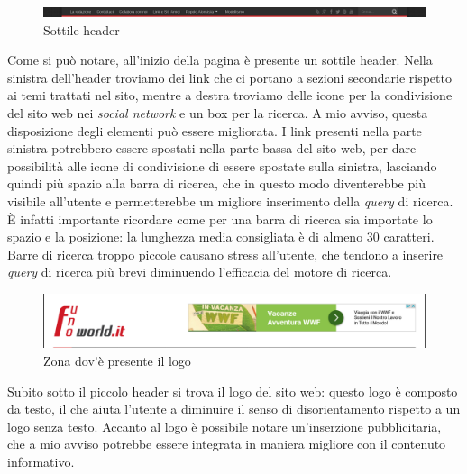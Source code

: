 \begin{figure}[H]
  \centering
  \includegraphics[scale=0.27]{top_header}
  \caption{Sottile header}
\end{figure}
Come si pu\`o notare, all'inizio della pagina \`e presente un sottile header.
Nella sinistra dell'header troviamo dei link che ci portano a sezioni secondarie
rispetto ai temi trattati nel sito, mentre a destra troviamo delle icone per la
condivisione del sito web nei \textit{social network} e un box per la ricerca.
A mio avviso, questa disposizione degli elementi pu\`o essere migliorata. I link
presenti nella parte sinistra potrebbero essere spostati nella parte bassa del
sito web, per dare possibilit\`a alle icone di condivisione di essere spostate
sulla sinistra, lasciando quindi pi\`u spazio alla barra di ricerca, che in
questo modo diventerebbe pi\`u visibile all'utente e permetterebbe un migliore
inserimento della \textit{query} di ricerca. \`E infatti importante ricordare
come per una barra di ricerca sia importate lo spazio e la posizione: la
lunghezza media consigliata \`e di almeno 30 caratteri. Barre di ricerca troppo
piccole causano stress all'utente, che tendono a inserire \textit{query} di
ricerca pi\`u brevi diminuendo l'efficacia del motore di ricerca.


\begin{figure}[H]
  \centering
  \includegraphics[scale=0.3]{top_logo}
  \caption{Zona dov'è presente il logo}
\end{figure}
Subito sotto il piccolo header si trova il logo del sito web: questo logo
\`e composto da testo, il che aiuta l'utente a diminuire il senso di
disorientamento rispetto a un logo senza testo.
Accanto al logo \`e possibile notare un'inserzione pubblicitaria, che a mio
avviso potrebbe essere integrata in maniera migliore con il contenuto
informativo.


